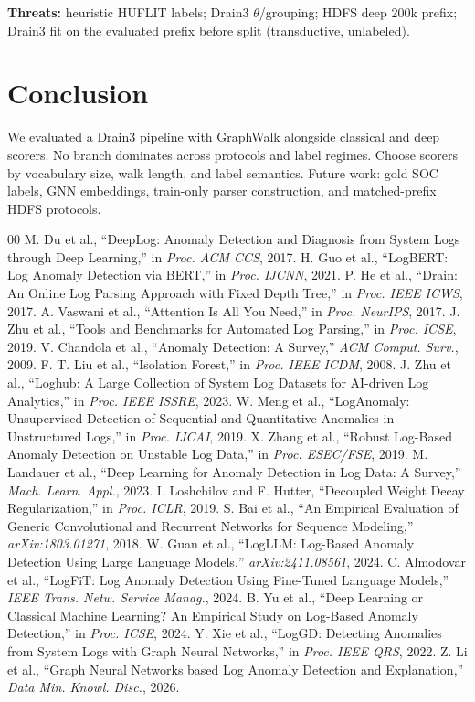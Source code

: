\documentclass[runningheads]{llncs}
\begin{document}
\textbf{Threats:} heuristic HUFLIT labels; Drain3 $\theta$/grouping; HDFS deep 200k prefix; Drain3 fit on the evaluated prefix before split (transductive, unlabeled).

\section{Conclusion}
We evaluated a Drain3 pipeline with GraphWalk alongside classical and deep scorers. No branch dominates across protocols and label regimes. Choose scorers by vocabulary size, walk length, and label semantics. Future work: gold SOC labels, GNN embeddings, train-only parser construction, and matched-prefix HDFS protocols.

\begin{thebibliography}{00}
\setlength{\itemsep}{0pt}
\setlength{\parskip}{0pt}
 M. Du et al., ``DeepLog: Anomaly Detection and Diagnosis from System Logs through Deep Learning,'' in \textit{Proc. ACM CCS}, 2017.
 H. Guo et al., ``LogBERT: Log Anomaly Detection via BERT,'' in \textit{Proc. IJCNN}, 2021.
 P. He et al., ``Drain: An Online Log Parsing Approach with Fixed Depth Tree,'' in \textit{Proc. IEEE ICWS}, 2017.
 A. Vaswani et al., ``Attention Is All You Need,'' in \textit{Proc. NeurIPS}, 2017.
 J. Zhu et al., ``Tools and Benchmarks for Automated Log Parsing,'' in \textit{Proc. ICSE}, 2019.
 V. Chandola et al., ``Anomaly Detection: A Survey,'' \textit{ACM Comput. Surv.}, 2009.
 F. T. Liu et al., ``Isolation Forest,'' in \textit{Proc. IEEE ICDM}, 2008.
 J. Zhu et al., ``Loghub: A Large Collection of System Log Datasets for AI-driven Log Analytics,'' in \textit{Proc. IEEE ISSRE}, 2023.
 W. Meng et al., ``LogAnomaly: Unsupervised Detection of Sequential and Quantitative Anomalies in Unstructured Logs,'' in \textit{Proc. IJCAI}, 2019.
 X. Zhang et al., ``Robust Log-Based Anomaly Detection on Unstable Log Data,'' in \textit{Proc. ESEC/FSE}, 2019.
 M. Landauer et al., ``Deep Learning for Anomaly Detection in Log Data: A Survey,'' \textit{Mach. Learn. Appl.}, 2023.
 I. Loshchilov and F. Hutter, ``Decoupled Weight Decay Regularization,'' in \textit{Proc. ICLR}, 2019.
 S. Bai et al., ``An Empirical Evaluation of Generic Convolutional and Recurrent Networks for Sequence Modeling,'' \textit{arXiv:1803.01271}, 2018.
 W. Guan et al., ``LogLLM: Log-Based Anomaly Detection Using Large Language Models,'' \textit{arXiv:2411.08561}, 2024.
 C. Almodovar et al., ``LogFiT: Log Anomaly Detection Using Fine-Tuned Language Models,'' \textit{IEEE Trans. Netw. Service Manag.}, 2024.
 B. Yu et al., ``Deep Learning or Classical Machine Learning? An Empirical Study on Log-Based Anomaly Detection,'' in \textit{Proc. ICSE}, 2024.
 Y. Xie et al., ``LogGD: Detecting Anomalies from System Logs with Graph Neural Networks,'' in \textit{Proc. IEEE QRS}, 2022.
 Z. Li et al., ``Graph Neural Networks based Log Anomaly Detection and Explanation,'' \textit{Data Min. Knowl. Disc.}, 2026.
\end{thebibliography}
\end{document}
